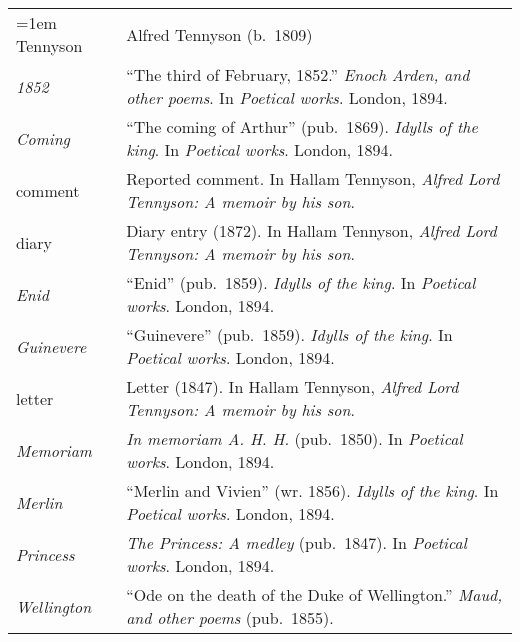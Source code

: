 \begin{xltabular}{\textwidth}{ lQ }
\hangindent=1em  Tennyson & Alfred Tennyson (b.~1809) \\
\hspace{1em}\textit{1852} & ``The third of February, 1852.'' \textit{Enoch Arden, and other poems}. In \textit{Poetical works}. London, 1894. \\
\hspace{1em}\textit{Coming} & ``The coming of Arthur'' (pub.~1869). \textit{Idylls of the king}. In \textit{Poetical works}. London, 1894. \\ %
\hspace{1em}comment & Reported comment. In Hallam Tennyson, \textit{Alfred Lord Tennyson: A memoir by his son}.  \\ %
\hspace{1em}diary & Diary entry (1872). In Hallam Tennyson, \textit{Alfred Lord Tennyson: A memoir by his son}. \\ %
\hspace{1em}\textit{Enid} & ``Enid'' (pub.~1859). \textit{Idylls of the king}. In \textit{Poetical works}. London, 1894. \\
\hspace{1em}\textit{Guinevere} & ``Guinevere'' (pub.~1859). \textit{Idylls of the king}. In \textit{Poetical works}. London, 1894. \\
\hspace{1em}letter & Letter (1847). In Hallam Tennyson, \textit{Alfred Lord Tennyson: A memoir by his son}. \\  %
\hspace{1em}\textit{Memoriam} & \textit{In memoriam A. H. H.} (pub.~1850). In \textit{Poetical works}. London, 1894. \\
\hspace{1em}\textit{Merlin} & ``Merlin and Vivien'' (wr. 1856). \textit{Idylls of the king}. In \textit{Poetical works}. London, 1894. \\
\hspace{1em}\textit{Princess} & \textit{The Princess: A medley} (pub.~1847). In \textit{Poetical works}. London, 1894. \\
\hspace{1em}\textit{Wellington} & ``Ode on the death of the Duke of Wellington.'' \textit{Maud, and other poems} (pub.~1855). \\


\end{xltabular}
